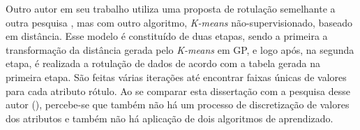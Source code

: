 

Outro autor  \cite{imperes2018} em seu trabalho utiliza uma proposta de rotulação semelhante a outra pesquisa \cite{Filho2015}, mas com outro algoritmo, \textit{K-means} não-supervisionado, baseado em distância. Esse modelo é constituído de duas etapas, sendo a primeira a transformação da distância gerada pelo \textit{K-means} em GP, e logo após, na segunda etapa, é realizada a rotulação de dados de acordo com a tabela gerada na primeira etapa. São feitas várias iterações até encontrar faixas únicas de valores para cada atributo rótulo. Ao se comparar esta dissertação com a pesquisa desse autor (\cite{imperes2018}), percebe-se que também não há um processo de discretização de valores dos atributos e também não há aplicação de dois algoritmos de aprendizado. 


